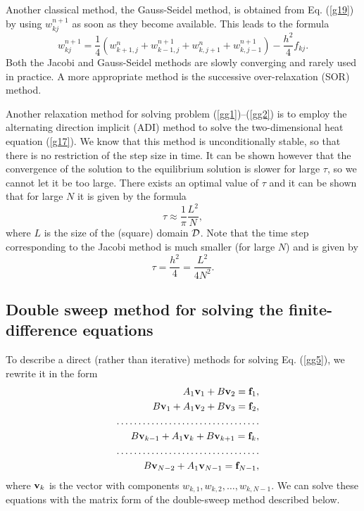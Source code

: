 Another classical method, the Gauss-Seidel method, is obtained from Eq. (\ref{g19})
by using $w_{kj}^{n+1}$ as soon as they become available. This leads to the formula
\begin{equation}
w_{kj}^{n+1}=\frac{1}{4}\left(w^{n}_{k+1,j}+w^{n+1}_{k-1,j}+w^{n}_{k,j+1}+w^{n+1}_{k,j-1}\right)
-\frac{h^2}{4}f_{kj}. \label{g20}
\end{equation}
Both the Jacobi and Gauss-Seidel methods are slowly converging and rarely used in practice.
A more appropriate method is the successive over-relaxation (SOR) method.

Another relaxation method for solving problem (\ref{gg1})--(\ref{gg2}) is to employ the alternating direction
implicit (ADI) method to solve the two-dimensional heat equation (\ref{g17}).
We know that this method is unconditionally stable, so that
there is no restriction of the step size in time. It can be shown however that the convergence of the
solution to the equilibrium solution is slower for large $\tau$, so we cannot let it be too large.
There exists an optimal value of $\tau$ and it can be shown that for large $N$ it is given by the formula
\[
\tau\approx\frac{1}{\pi}\frac{L^2}{N},
\]
where $L$ is the size of the (square) domain ${\cal D}$. Note that the time step corresponding
to the Jacobi method is much smaller (for large $N$) and is given by
\[
\tau=\frac{h^2}{4}=\frac{L^2}{4N^2}.
\]


\subsection{Double sweep method for solving the finite-difference equations}
To describe a direct (rather than iterative) methods for solving Eq. (\ref{gg5}), we rewrite
it in the form
\begin{eqnarray}
&&A_{1}{\bf v}_{1}+B{\bf v}_{2}={\bf f}_{1}, \nonumber \\
&&B{\bf v}_{1}+A_{1}{\bf v}_{2}+B{\bf v}_{3}={\bf f}_{2}, \nonumber \\
&& \dots \dots \dots \dots \dots \dots \dots \dots \dots \dots \dots \nonumber \\
&&B{\bf v}_{k-1}+A_{1}{\bf v}_{k}+B{\bf v}_{k+1}={\bf f}_{k}, \nonumber \\
&& \dots \dots \dots \dots \dots \dots \dots \dots \dots \dots \dots \nonumber \\
&&B{\bf v}_{N-2}+A_{1}{\bf v}_{N-1}={\bf f}_{{N-1}}, \label{g21}
\end{eqnarray}
where ${\bf v}_{k}$ is the vector with components $w_{k,1},
w_{k,2}, \dots, w_{k,N-1}$.
We can solve these equations with
the matrix form of the double-sweep method described below.



